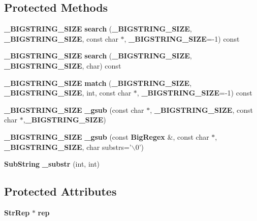 \subsection*{Protected Methods}
\begin{CompactItemize}
\item 
{\bf \_\-BIGSTRING\_\-SIZE} {\bf search} ({\bf \_\-BIGSTRING\_\-SIZE}, {\bf \_\-BIGSTRING\_\-SIZE}, const char $\ast$, {\bf \_\-BIGSTRING\_\-SIZE}=-1) const
\item 
{\bf \_\-BIGSTRING\_\-SIZE} {\bf search} ({\bf \_\-BIGSTRING\_\-SIZE}, {\bf \_\-BIGSTRING\_\-SIZE}, char) const
\item 
{\bf \_\-BIGSTRING\_\-SIZE} {\bf match} ({\bf \_\-BIGSTRING\_\-SIZE}, {\bf \_\-BIGSTRING\_\-SIZE}, int, const char $\ast$, {\bf \_\-BIGSTRING\_\-SIZE}=-1) const
\item 
{\bf \_\-BIGSTRING\_\-SIZE} {\bf \_\-gsub} (const char $\ast$, {\bf \_\-BIGSTRING\_\-SIZE}, const char $\ast$,{\bf \_\-BIGSTRING\_\-SIZE})
\item 
{\bf \_\-BIGSTRING\_\-SIZE} {\bf \_\-gsub} (const {\bf Big\-Regex} \&, const char $\ast$, {\bf \_\-BIGSTRING\_\-SIZE}, char substrs='$\backslash$0')
\item 
{\bf Sub\-String} {\bf \_\-substr} (int, int)
\end{CompactItemize}
\subsection*{Protected Attributes}
\begin{CompactItemize}
\item 
{\bf Str\-Rep} $\ast$ {\bf rep}
\end{CompactItemize}
